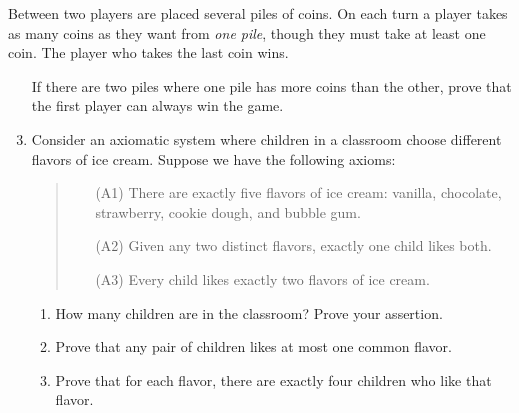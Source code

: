 \begin{exercises}{}{}
	\exstart Between two players are placed several piles of coins. On each turn a player takes as many coins as they want from \emph{one pile}, though they must take at least one coin. The player who takes the last coin wins.
	\begin{enumerate}\setcounter{enumi}{1}
	  \item[]If there are two piles where one pile has more coins than the other, prove that the first player can always win the game.
	  
	  \item Consider an axiomatic system where children in a classroom choose different flavors of ice cream. Suppose we have the following axioms:
	  \begin{quote}
	  \begin{itemize}
	  	\item[(A1)] There are exactly five flavors of ice cream: vanilla, chocolate, strawberry, cookie dough, and bubble gum.
	  	\item[(A2)] Given any two distinct flavors, exactly one child likes both.
	  	\item[(A3)] Every child likes exactly two flavors of ice cream.
	  \end{itemize}
	  \end{quote}
	  \begin{enumerate}
	    \item How many children are in the classroom? Prove your assertion.
	    \item Prove that any pair of children likes at most one common flavor.
	    \item Prove that for each flavor, there are exactly four children who like that flavor.
		\end{enumerate}
		
	

\end{enumerate}
\end{exercises}
